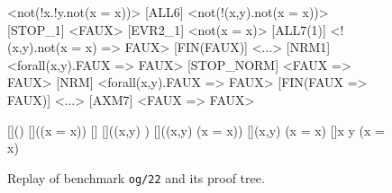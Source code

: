 \begin{figure}[t]
	\centering
	\begin{minipage}[c]{0.40\linewidth}
		\begin{codePP}
[ALL2] <not(!x.!y.not(x = x))>
[ALL6] <not(!(x,y).not(x = x))>
[STOP_1] <FAUX>
[EVR2_1] <not(x = x)>
[ALL7(1)] <!(x,y).not(x = x) => FAUX>
[FIN(FAUX)] <$\ldots$>
[NRM1] <forall(x,y).FAUX => FAUX>
[STOP_NORM] <FAUX => FAUX>
[NRM] <forall(x,y).FAUX => FAUX>
[FIN(FAUX => FAUX)] <$\ldots$>
[AXM7] <FAUX => FAUX>
		\end{codePP}
	\end{minipage}\hfill
	\begin{minipage}[c]{0.57\linewidth}
		\centering\footnotesize
		\begin{prooftree}
			[]{(\seq \bot) \yields \bot}
			[]{(\seq \lnot(x = x)) \yields \bot}
			[]{\seq \bot \Rightarrow \bot}
			[]{\seq (\Dia (x,y) \cdot \bot) \Rightarrow \bot}
			[]{\seq (\forall (x,y) \cdot \lnot(x = x)) \Rightarrow \bot}
			[]{\seq \lnot \forall (x,y) \cdot \lnot(x = x)}
			[]{\seq \lnot \forall x \cdot \forall y \cdot \lnot(x = x)}
		\end{prooftree}
	\end{minipage}
	\caption{Replay of benchmark \texttt{og/22} and its proof tree.}
	\label{fig:replay}
\end{figure}
